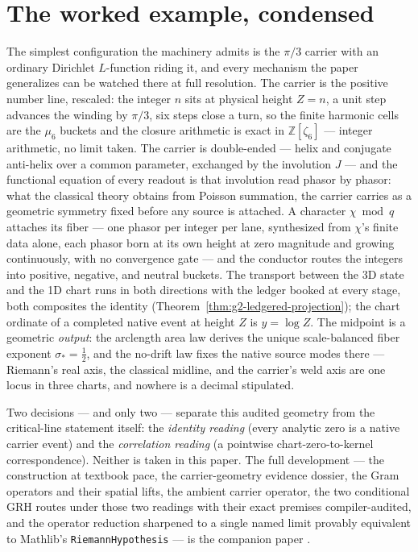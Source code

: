 \documentclass[11pt]{article}
\theoremstyle{definition}
\begin{document}
\section{The worked example, condensed}\label{sec:worked-example}

The simplest configuration the machinery admits is the \(\pi/3\) carrier
with an ordinary Dirichlet \(L\)-function riding it, and every mechanism the
paper generalizes can be watched there at full resolution.  The carrier is
the positive number line, rescaled: the integer \(n\) sits at physical
height \(Z=n\), a unit step advances the winding by \(\pi/3\), six steps
close a turn, so the finite harmonic cells are the \(\mu_6\) buckets and the
closure arithmetic is exact in \(\mathbb Z[\zeta_6]\) --- integer
arithmetic, no limit taken.  The carrier is double-ended --- helix and
conjugate anti-helix over a common parameter, exchanged by the involution
\(J\) --- and the functional equation of every readout is that involution
read phasor by phasor: what the classical theory obtains from Poisson
summation, the carrier carries as a geometric symmetry fixed before any
source is attached.  A character \(\chi\bmod q\) attaches its fiber ---
one phasor per integer per lane, synthesized from \(\chi\)'s finite data
alone, each phasor born at its own height at zero magnitude and growing
continuously, with no convergence gate --- and the conductor routes the
integers into positive, negative, and neutral buckets.  The transport
between the 3D state and the 1D chart runs in both directions with the
ledger booked at every stage, both composites the identity
(Theorem~\ref{thm:g2-ledgered-projection}); the chart ordinate of a
completed native event at height \(Z\) is \(y=\log Z\).  The midpoint is a
geometric \emph{output}: the arclength area law derives the unique
scale-balanced fiber exponent \(\sigma_*=\tfrac12\), and the no-drift law
fixes the native source modes there --- Riemann's real axis, the classical
midline, and the carrier's weld axis are one locus in three charts, and
nowhere is a decimal stipulated.

Two decisions --- and only two --- separate this audited geometry from the
critical-line statement itself: the \emph{identity reading} (every analytic
zero is a native carrier event) and the \emph{correlation reading} (a
pointwise chart-zero-to-kernel correspondence).  Neither is taken in this
paper.  The full development --- the construction at textbook pace, the
carrier-geometry evidence dossier, the Gram operators and their spatial
lifts, the ambient carrier operator, the two conditional GRH routes under
those two readings with their exact premises compiler-audited, and the
operator reduction sharpened to a single named limit provably equivalent to
Mathlib's \texttt{RiemannHypothesis} --- is the companion paper
\cite{GRHCompanion}.
\end{document}
